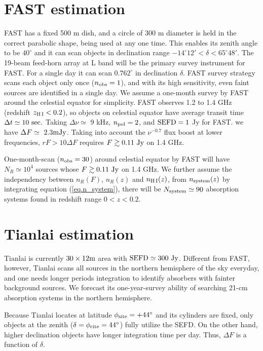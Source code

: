 \documentclass[]{raa}
\newcommand{\HI}{{H{\small\,I}}}
\begin{document}
\section{FAST estimation}\label{sec.FAST}

FAST has a fixed 500 m dish, and a circle of 300 m diameter is held
in the correct parabolic shape, being used at any one time. This
enables its zenith angle to be $40^\circ$ and it can scan objects
in declination range $-14^\circ 12'<\delta<65^\circ 48'$.
The 19-beam feed-horn array at L band will be the primary survey
instrument for FAST. For a single day it can scan $0.762^\circ$
in declination $\delta$. FAST survey strategy scans each object
only once ($n_{\rm obs}=1$), and with its high sensitivity,
even faint sources are identified in a single day. 
We assume a one-month survey by FAST
around the celestial equator for simplicity. FAST observes
1.2 to 1.4 GHz (redshift $z_{\rm \HI}<0.2$), so objects on celestial equator
have average transit time $\Delta t \simeq 10\ {\rm sec.}$
Taking $\Delta\nu\simeq$ 9 kHz, $n_{\rm pol}=2$, and
${\rm SEFD}=1$ Jy for FAST.
we have $\Delta F \simeq\ 2.3 {\rm mJy}$.
Taking into account the $\nu^{-0.7}$ flux boost at lower
frequencies, $rF>10\Delta F$ requires $F\gtrsim 0.11\ {\rm Jy}$ on 1.4 GHz.

One-month-scan ($n_{\rm obs}=30$) around celestial equator by FAST will have
$N_R\simeq 10^4$ sources whose $F\gtrsim 0.11\ {\rm Jy}$ on 1.4 GHz.
We further assume the independency between $n_R(F)$, $n_R(z)$
and $n_{\rm\HI}(z)$, from $n_{\rm system}(z)$ by integrating
equation (\ref{eq.n_system}), there will be $N_{\rm system}\simeq 90$ absorption
systems found in redshift range $0<z<0.2$.


\section{Tianlai estimation}\label{sec.Tianlai}

Tianlai is currently $30\times 12 {\rm m}$ area with
${\rm SEFD}\simeq 300\ {\rm Jy}$. Different from FAST, however,
Tianlai scans all sources in the northern hemisphere of the sky
everyday, and one needs longer periods integration to
identify absorbers with fainter background sources.
We forecast its one-year-survey ability of searching 21-cm
absorption systems in the northern hemisphere.

Because Tianlai locates at latitude
$\phi_{\rm site}=+44^\circ$ and its cylinders are fixed, only
objects at the zenith ($\delta=\phi_{\rm cite}=44^\circ$) fully utilize
the SEFD. On the other hand, higher declination objects
have longer integration time per day. Thus, $\Delta F$ is
a function of $\delta$.
\end{document}
